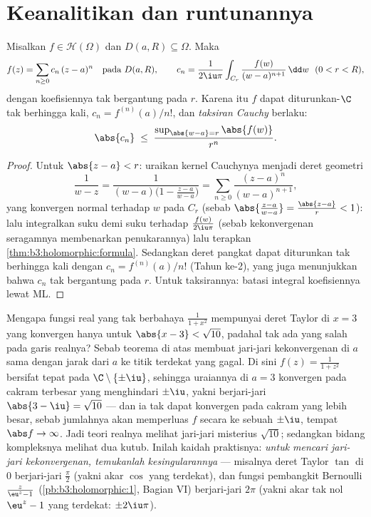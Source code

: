 \section{Keanalitikan dan runtunannya}

\begin{theorem}[Holomorfik $=$ analitik]
\label{thm:b3:holomorphic:analytic}
Misalkan $f \in \mathcal H(\Omega)$ dan $D(a, R) \subseteq \Omega$.
Maka
\[
f(z) = \sum_{n\geq0}c_n\,(z - a)^n \quad \text{pada } D(a, R),
\qquad
c_n = \frac1{2\iu\pi}\int_{C_r}\frac{f(w)}{(w -
a)^{n+1}}\,\dd w \ \ (0 < r < R),
\]
dengan koefisiennya tak bergantung pada $r$. Karena itu $f$ dapat
diturunkan-$\C$ tak berhingga kali, $c_n = f^{(n)}(a)/n!$, dan
\emph{taksiran Cauchy} berlaku:
\[
\abs{c_n} \;\leq\; \frac{\sup_{\abs{w - a} =
r}\abs{f(w)}}{r^{n}} .
\]
\end{theorem}

\begin{proof}
Untuk $\abs{z - a} < r$: uraikan kernel Cauchynya menjadi
deret geometri
\[
\frac1{w - z} = \frac1{(w - a)\bigl(1 - \frac{z - a}{w -
a}\bigr)} = \sum_{n\geq0}\frac{(z - a)^n}{(w - a)^{n+1}},
\]
yang konvergen normal terhadap $w$ pada $C_r$ (sebab $\abs{\frac{z-a}{w-a}} =
\frac{\abs{z-a}}r < 1$): lalu integralkan suku demi suku terhadap
$\frac{f(w)}{2\iu\pi}$ (sebab kekonvergenan seragamnya membenarkan
penukarannya) lalu terapkan \cref{thm:b3:holomorphic:formula}. Sedangkan
deret pangkat dapat diturunkan tak berhingga kali dengan $c_n =
f^{(n)}(a)/n!$ (Tahun ke-2), yang juga menunjukkan bahwa $c_n$ tak
bergantung pada $r$. Untuk taksirannya: batasi integral koefisiennya
lewat ML.
\end{proof}

\begin{example}
\label{ex:b3:holomorphic:radius}
Mengapa fungsi real yang tak berbahaya $\frac1{1 + x^2}$ mempunyai
deret Taylor di $x = 3$ yang konvergen hanya untuk $\abs{x - 3} <
\sqrt{10}$, padahal tak ada yang salah pada garis realnya? Sebab
teorema di atas membuat jari-jari kekonvergenan di $a$
sama dengan jarak dari $a$ ke titik terdekat yang
 gagal. Di sini $f(z) = \frac1{1 + z^2}$ bersifat
 tepat pada $\C\setminus\{\pm\iu\}$, sehingga
uraiannya di $a = 3$ konvergen pada cakram terbesar yang menghindari
$\pm\iu$, yakni berjari-jari $\abs{3 - \iu} = \sqrt{10}$ --- dan
ia tak dapat konvergen pada cakram yang lebih besar, sebab jumlahnya akan memperluas
$f$ secara  ke sebuah  $\pm\iu$, tempat
$\abs f \to \infty$. Jadi teori realnya melihat jari-jari misterius
$\sqrt{10}$; sedangkan bidang kompleksnya melihat dua kutub.
Inilah kaidah praktisnya: \emph{untuk mencari jari-jari
kekonvergenan, temukanlah kesingularannya} --- misalnya deret
Taylor $\tan$ di $0$ berjari-jari $\frac\pi2$ (yakni akar
$\cos$ yang terdekat), dan fungsi pembangkit Bernoulli
$\frac z{\eu^z - 1}$ (\cref{pb:b3:holomorphic:1}, Bagian VI)
berjari-jari $2\pi$ (yakni akar tak nol $\eu^z - 1$ yang terdekat:
$\pm2\iu\pi$).
\end{example}

